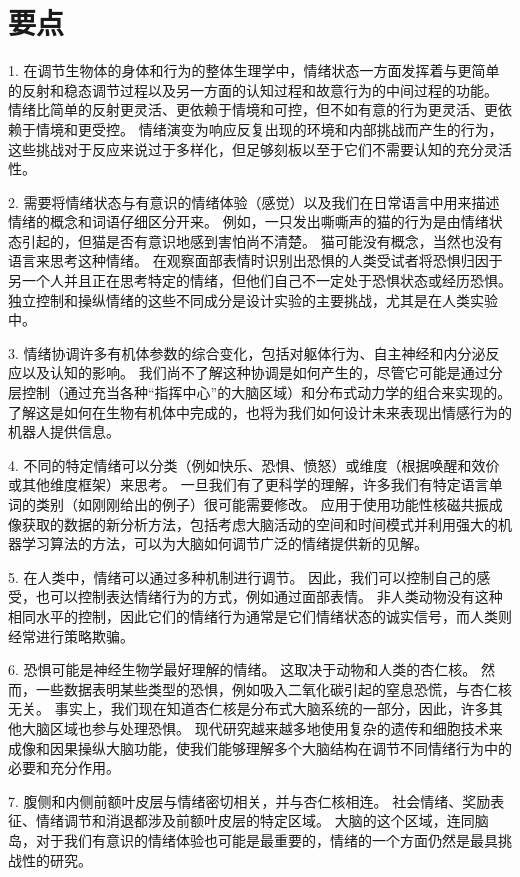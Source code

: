 \section{要点}

1. 在调节生物体的身体和行为的整体生理学中，情绪状态一方面发挥着与更简单的反射和稳态调节过程以及另一方面的认知过程和故意行为的中间过程的功能。
情绪比简单的反射更灵活、更依赖于情境和可控，但不如有意的行为更灵活、更依赖于情境和更受控。
情绪演变为响应反复出现的环境和内部挑战而产生的行为，这些挑战对于反应来说过于多样化，但足够刻板以至于它们不需要认知的充分灵活性。


2. 需要将情绪状态与有意识的情绪体验（感觉）以及我们在日常语言中用来描述情绪的概念和词语仔细区分开来。
例如，一只发出嘶嘶声的猫的行为是由情绪状态引起的，但猫是否有意识地感到害怕尚不清楚。
猫可能没有概念，当然也没有语言来思考这种情绪。
在观察面部表情时识别出恐惧的人类受试者将恐惧归因于另一个人并且正在思考特定的情绪，但他们自己不一定处于恐惧状态或经历恐惧。
独立控制和操纵情绪的这些不同成分是设计实验的主要挑战，尤其是在人类实验中。


3. 情绪协调许多有机体参数的综合变化，包括对躯体行为、自主神经和内分泌反应以及认知的影响。
我们尚不了解这种协调是如何产生的，尽管它可能是通过分层控制（通过充当各种“指挥中心”的大脑区域）和分布式动力学的组合来实现的。
了解这是如何在生物有机体中完成的，也将为我们如何设计未来表现出情感行为的机器人提供信息。


4. 不同的特定情绪可以分类（例如快乐、恐惧、愤怒）或维度（根据唤醒和效价或其他维度框架）来思考。
一旦我们有了更科学的理解，许多我们有特定语言单词的类别（如刚刚给出的例子）很可能需要修改。
应用于使用功能性核磁共振成像获取的数据的新分析方法，包括考虑大脑活动的空间和时间模式并利用强大的机器学习算法的方法，可以为大脑如何调节广泛的情绪提供新的见解。


5. 在人类中，情绪可以通过多种机制进行调节。
因此，我们可以控制自己的感受，也可以控制表达情绪行为的方式，例如通过面部表情。
非人类动物没有这种相同水平的控制，因此它们的情绪行为通常是它们情绪状态的诚实信号，而人类则经常进行策略欺骗。


6. 恐惧可能是神经生物学最好理解的情绪。
这取决于动物和人类的杏仁核。
然而，一些数据表明某些类型的恐惧，例如吸入二氧化碳引起的窒息恐慌，与杏仁核无关。
事实上，我们现在知道杏仁核是分布式大脑系统的一部分，因此，许多其他大脑区域也参与处理恐惧。
现代研究越来越多地使用复杂的遗传和细胞技术来成像和因果操纵大脑功能，使我们能够理解多个大脑结构在调节不同情绪行为中的必要和充分作用。


7. 腹侧和内侧前额叶皮层与情绪密切相关，并与杏仁核相连。
社会情绪、奖励表征、情绪调节和消退都涉及前额叶皮层的特定区域。
大脑的这个区域，连同脑岛，对于我们有意识的情绪体验也可能是最重要的，情绪的一个方面仍然是最具挑战性的研究。

